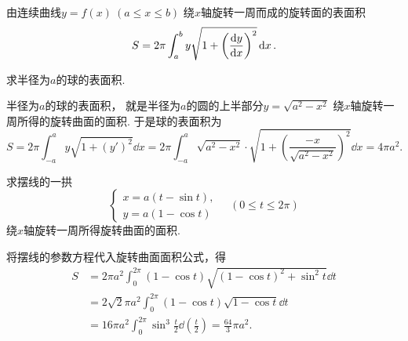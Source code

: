 \begin{theorem}[古尔丁表面积定理]
由连续曲线\(y=f(x)\ (a \leq x \leq b)\)
绕\(x\)轴旋转一周而成的旋转面的表面积\begin{equation}
	S = 2\pi \int_a^b y \sqrt{1+\left(\dv{y}{x}\right)^2} \dd{x}.
\end{equation}
\end{theorem}

\begin{example}
求半径为\(a\)的球的表面积.
\begin{solution}
半径为\(a\)的球的表面积，
就是半径为\(a\)的圆的上半部分\(y=\sqrt{a^2-x^2}\)
绕\(x\)轴旋转一周所得的旋转曲面的面积.
于是球的表面积为\begin{equation*}
	S = 2\pi \int_{-a}^a y \sqrt{1+(y')^2} \dd{x}
	= 2\pi \int_{-a}^a \sqrt{a^2-x^2} \cdot
		\sqrt{1+\left(\frac{-x}{\sqrt{a^2-x^2}}\right)^2} \dd{x}
	= 4\pi a^2.
\end{equation*}
\end{solution}
\end{example}

\begin{example}
求摆线的一拱\begin{equation*}
	\left\{ \begin{array}{l}
		x = a (t - \sin t), \\
		y = a (1 - \cos t)
	\end{array} \right.
	\quad(0 \leq t \leq 2\pi)
\end{equation*}绕\(x\)轴旋转一周所得旋转曲面的面积.
\begin{solution}
将摆线的参数方程代入旋转曲面面积公式，得\begin{align*}
	S &= 2\pi a^2 \int_0^{2\pi} (1-\cos t) \sqrt{(1-\cos t)^2 + \sin^2 t} \dd{t} \\
	&= 2\sqrt2 \pi a^2 \int_0^{2\pi} (1-\cos t) \sqrt{1-\cos t} \dd{t} \\
	&= 16\pi a^2 \int_0^{2\pi} \sin^3 \frac{t}{2} \dd(\frac{t}{2})
	= \frac{64}3 \pi a^2.
\end{align*}
\end{solution}
\end{example}
